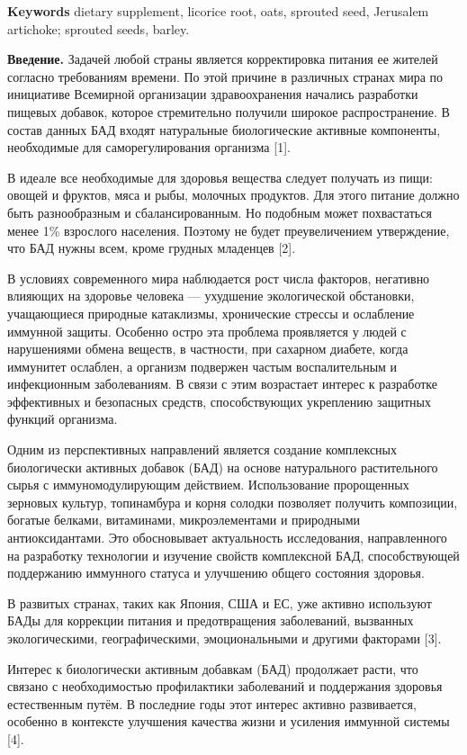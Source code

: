 {\bfseries Keywords} dietary supplement, licorice root, oats, sprouted
seed, Jerusalem artichoke; sprouted seeds, barley.

{\bfseries Введение.} Задачей любой страны является корректировка питания
ее жителей согласно требованиям времени. По этой причине в различных
странах мира по инициативе Всемирной организации здравоохранения
начались разработки пищевых добавок, которое стремительно получили
широкое распространение. В состав данных БАД входят натуральные
биологические активные компоненты, необходимые для саморегулирования
организма {[}1{]}.

В идеале все необходимые для здоровья вещества следует получать из пищи:
овощей и фруктов, мяса и рыбы, молочных продуктов. Для этого питание
должно быть разнообразным и сбалансированным. Но подобным может
похвастаться менее 1\% взрослого населения. Поэтому не будет
преувеличением утверждение, что БАД нужны всем, кроме грудных младенцев
{[}2{]}.

В условиях современного мира наблюдается рост числа факторов, негативно
влияющих на здоровье человека --- ухудшение экологической обстановки,
учащающиеся природные катаклизмы, хронические стрессы и ослабление
иммунной защиты. Особенно остро эта проблема проявляется у людей с
нарушениями обмена веществ, в частности, при сахарном диабете, когда
иммунитет ослаблен, а организм подвержен частым воспалительным и
инфекционным заболеваниям. В связи с этим возрастает интерес к
разработке эффективных и безопасных средств, способствующих укреплению
защитных функций организма.

Одним из перспективных направлений является создание комплексных
биологически активных добавок (БАД) на основе натурального растительного
сырья с иммуномодулирующим действием. Использование пророщенных зерновых
культур, топинамбура и корня солодки позволяет получить композиции,
богатые белками, витаминами, микроэлементами и природными
антиоксидантами. Это обосновывает актуальность исследования,
направленного на разработку технологии и изучение свойств комплексной
БАД, способствующей поддержанию иммунного статуса и улучшению общего
состояния здоровья.

В развитых странах, таких как Япония, США и ЕС, уже активно используют
БАДы для коррекции питания и предотвращения заболеваний, вызванных
экологическими, географическими, эмоциональными и другими факторами
{[}3{]}.

Интерес к биологически активным добавкам (БАД) продолжает расти, что
связано с необходимостью профилактики заболеваний и поддержания здоровья
естественным путём. В последние годы этот интерес активно развивается,
особенно в контексте улучшения качества жизни и усиления иммунной
системы {[}4{]}.

